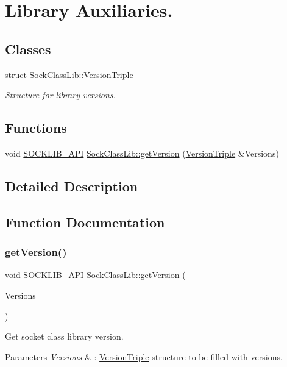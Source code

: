 \hypertarget{group__LIB__GROUP}{}\section{Library Auxiliaries.}
\label{group__LIB__GROUP}
\subsection*{Classes}
\begin{DoxyCompactItemize}
\item 
struct \hyperlink{structSockClassLib_1_1VersionTriple}{Sock\+Class\+Lib\+::\+Version\+Triple}
\begin{DoxyCompactList}\small\item\em Structure for library versions. \end{DoxyCompactList}\end{DoxyCompactItemize}
\subsection*{Functions}
\begin{DoxyCompactItemize}
\item 
void \hyperlink{sockclasslib_8h_a9cc1058a4314729e5966c036881bed34}{S\+O\+C\+K\+L\+I\+B\+\_\+\+A\+PI} \hyperlink{group__LIB__GROUP_ga618a999613777f55f50f3e9b3253b6e7}{Sock\+Class\+Lib\+::get\+Version} (\hyperlink{structSockClassLib_1_1VersionTriple}{Version\+Triple} \&Versions)
\end{DoxyCompactItemize}


\subsection{Detailed Description}


\subsection{Function Documentation}
\mbox{\label{group__LIB__GROUP_ga618a999613777f55f50f3e9b3253b6e7}} 
\subsubsection{\texorpdfstring{get\+Version()}{getVersion()}}
{\footnotesize\ttfamily void \hyperlink{sockclasslib_8h_a9cc1058a4314729e5966c036881bed34}{S\+O\+C\+K\+L\+I\+B\+\_\+\+A\+PI} Sock\+Class\+Lib\+::get\+Version (\begin{DoxyParamCaption}\item[{\hyperlink{structSockClassLib_1_1VersionTriple}{Version\+Triple} \&}]{Versions }\end{DoxyParamCaption})\hspace{0.3cm}{\ttfamily [inline]}}

Get socket class library version. 
\begin{DoxyParams}{Parameters}
{\em Versions} & \+: \hyperlink{structSockClassLib_1_1VersionTriple}{Version\+Triple} structure to be filled with versions. \\
\hline
\end{DoxyParams}
